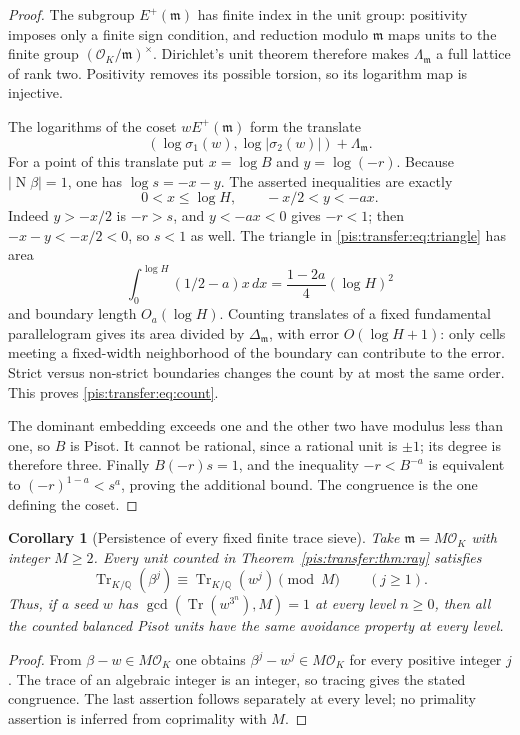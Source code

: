 \documentclass[11pt,a4paper]{article}
\newtheorem{corollary}[theorem]{Corollary}
\theoremstyle{definition}\newtheorem{definition}[theorem]{Definition}
\theoremstyle{remark}\newtheorem{remark}[theorem]{Remark}
\begin{document}
\begin{proof}
The subgroup $E^+(\mathfrak m)$ has finite index in the unit group:
positivity imposes only a finite sign condition, and reduction modulo
$\mathfrak m$ maps units to the finite group
$(\mathcal O_K/\mathfrak m)^\times$. Dirichlet's unit theorem therefore
makes $\Lambda_{\mathfrak m}$ a full lattice of rank two. Positivity
removes its possible torsion, so its logarithm map is injective.

The logarithms of the coset $wE^+(\mathfrak m)$ form the translate
\[
 (\log\sigma_1(w),\log|\sigma_2(w)|)+\Lambda_{\mathfrak m}.
\]
For a point of this translate put $x=\log B$ and $y=\log(-r)$.
Because $|\operatorname N\beta|=1$, one has $\log s=-x-y$.
The asserted inequalities are exactly
\begin{equation}\label{pis:transfer:eq:triangle}
 0<x\le\log H,\qquad -x/2<y<-ax.
\end{equation}
Indeed $y>-x/2$ is $-r>s$, and $y<-ax<0$ gives $-r<1$;
then $-x-y<-x/2<0$, so $s<1$ as well.
The triangle in \eqref{pis:transfer:eq:triangle} has area
\[
 \int_0^{\log H}(1/2-a)x\,dx
       =\frac{1-2a}{4}(\log H)^2
\]
and boundary length $O_a(\log H)$. Counting translates of a fixed
fundamental parallelogram gives its area divided by
$\Delta_{\mathfrak m}$, with error $O(\log H+1)$: only cells meeting a
fixed-width neighborhood of the boundary can contribute to the error.
Strict versus non-strict boundaries changes the count by at most the
same order. This proves \eqref{pis:transfer:eq:count}.

The dominant embedding exceeds one and the other two have modulus
less than one, so $B$ is Pisot. It cannot be rational, since a rational
unit is $\pm1$; its degree is therefore three. Finally
$B(-r)s=1$, and the inequality $-r<B^{-a}$ is equivalent to
$(-r)^{1-a}<s^a$, proving the additional bound. The congruence is the
one defining the coset.
\end{proof}

\begin{corollary}[Persistence of every fixed finite trace sieve]
\label{pis:transfer:cor:sieve}
Take $\mathfrak m=M\mathcal O_K$ with integer $M\ge2$. Every unit
counted in Theorem~\ref{pis:transfer:thm:ray} satisfies
\[
 \operatorname{Tr}_{K/\mathbb Q}(\beta^j)
 \equiv\operatorname{Tr}_{K/\mathbb Q}(w^j)\pmod M
 \qquad(j\ge1).
\]
Thus, if a seed $w$ has
$\gcd(\operatorname{Tr}(w^{3^n}),M)=1$ at every level $n\ge0$,
then all the counted balanced Pisot units have the same avoidance
property at every level.
\end{corollary}
\begin{proof}
From $\beta-w\in M\mathcal O_K$ one obtains
$\beta^j-w^j\in M\mathcal O_K$ for every positive integer $j$.
The trace of an algebraic integer is an integer, so tracing gives the
stated congruence. The last assertion follows separately at every
level; no primality assertion is inferred from coprimality with $M$.
\end{proof}
\end{document}
